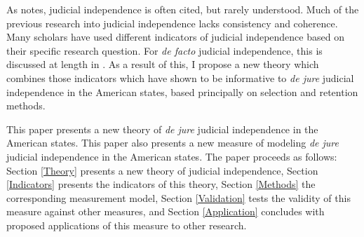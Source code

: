 \documentclass[Johnson MA Draft 2.tex]{subfiles}
\begin{document}
As \citet{Tiede2006} notes, judicial independence is often cited, but rarely understood.  Much of the previous research into judicial independence lacks consistency and coherence.  Many scholars have used different indicators of judicial independence based on their specific research question.  For \textit{de facto} judicial independence, this is discussed at length in \cite{Rios2014}.  As a result of this, I propose a new theory which combines those indicators which have shown to be informative to \textit{de jure} judicial independence in the American states, based principally on selection and retention methods.

This paper presents a new theory of \textit{de jure} judicial independence in the American states.  This paper also presents a new measure of modeling \textit{de jure} judicial independence in the American states.  The paper proceeds as follows: Section \ref{Theory} presents a new theory of judicial independence, Section \ref{Indicators} presents the indicators of this theory, Section \ref{Methods} the corresponding measurement model, Section \ref{Validation} tests the validity of this measure against other measures, and Section \ref{Application} concludes with proposed applications of this measure to other research.	
\end{document}
